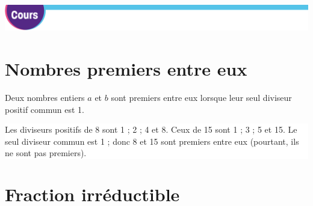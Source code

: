\newpage

\includegraphics[scale=0.5]{../MISC/pageCours.png} 

\section{ Nombres premiers entre eux}

\begin{DefTB}{ } 

\hspace{1mm}
\begin{minipage}{0.98\linewidth}
Deux nombres entiers $a$ et $b$ sont premiers entre eux lorsque leur seul diviseur positif commun est 1.
\end{minipage}

  \vspace{3mm}
\colorbox{white}{
\begin{minipage}{0.98\linewidth}

Les diviseurs positifs de 8 sont 1 ; 2 ; 4 et 8. Ceux de 15 sont 1 ; 3 ; 5 et 15. Le seul diviseur commun est 1 ;
donc 8 et 15 sont premiers entre eux (pourtant, ils ne sont pas premiers).

 \end{minipage}
}
\end{DefTB}


\section{ Fraction irréductible}

